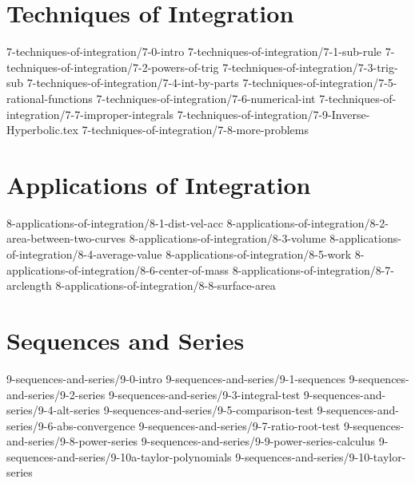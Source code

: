 \chapter{Techniques of Integration}\label{chap:TechniquesOfIntegration}
	{7-techniques-of-integration/7-0-intro}
	{7-techniques-of-integration/7-1-sub-rule}		
	{7-techniques-of-integration/7-2-powers-of-trig} 
	{7-techniques-of-integration/7-3-trig-sub} 
	{7-techniques-of-integration/7-4-int-by-parts} 
	{7-techniques-of-integration/7-5-rational-functions} 
	{7-techniques-of-integration/7-6-numerical-int} 
	{7-techniques-of-integration/7-7-improper-integrals}
	{7-techniques-of-integration/7-9-Inverse-Hyperbolic.tex}
	{7-techniques-of-integration/7-8-more-problems}  
	
\chapter{Applications of Integration}\label{chap:ApplicationsOfIntegration}	
	{8-applications-of-integration/8-1-dist-vel-acc}
	{8-applications-of-integration/8-2-area-between-two-curves}
	{8-applications-of-integration/8-3-volume}
	{8-applications-of-integration/8-4-average-value}
	{8-applications-of-integration/8-5-work}
	{8-applications-of-integration/8-6-center-of-mass}
	{8-applications-of-integration/8-7-arclength}
	{8-applications-of-integration/8-8-surface-area}
	
\chapter{Sequences and Series}\label{chap:SequencesSeries}
	{9-sequences-and-series/9-0-intro}
	{9-sequences-and-series/9-1-sequences}
	{9-sequences-and-series/9-2-series}
	{9-sequences-and-series/9-3-integral-test}
	{9-sequences-and-series/9-4-alt-series}
	{9-sequences-and-series/9-5-comparison-test}
	{9-sequences-and-series/9-6-abs-convergence}
	{9-sequences-and-series/9-7-ratio-root-test}
	{9-sequences-and-series/9-8-power-series}
	{9-sequences-and-series/9-9-power-series-calculus}
	{9-sequences-and-series/9-10a-taylor-polynomials}
	{9-sequences-and-series/9-10-taylor-series}


